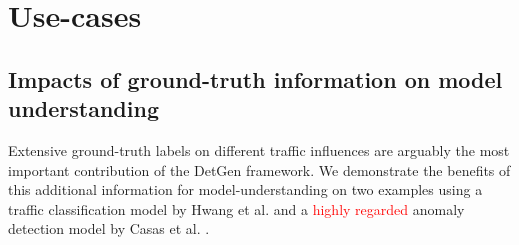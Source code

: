 \documentclass{article}
\begin{document}
%
%
%



\section{Use-cases}

\subsection{Impacts of ground-truth information on model understanding}

Extensive ground-truth labels on different traffic influences are arguably the most important contribution of the DetGen framework. We demonstrate the benefits of this additional information for model-understanding on two examples using a traffic classification model by Hwang et al. \cite{hwang2019lstm} and a \textcolor{red}{highly regarded} anomaly detection model by Casas et al. \cite{casas2012unsupervised}.
\end{document}
